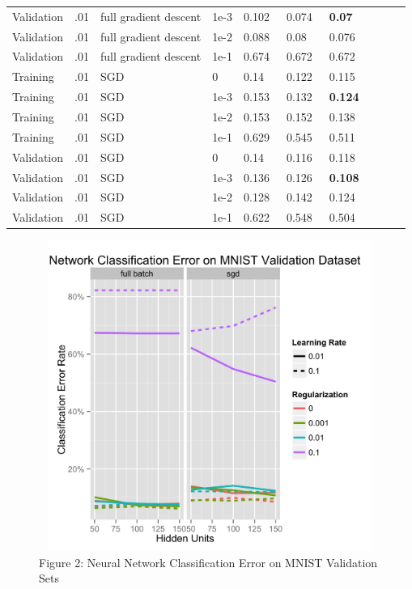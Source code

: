 \documentclass[10pt]{article}
\begin{document}
\begin{table}
\begin{tabular}{llllllllll}
Validation & .01 & full gradient descent & 1e-3 & 0.102 & 0.074 & \bf{0.07}  \\
Validation & .01 & full gradient descent & 1e-2 & 0.088 & 0.08  & 0.076 \\
Validation & .01 & full gradient descent & 1e-1 & 0.674 & 0.672 & 0.672 \\
\midrule
Training &.01 & SGD &  0 & 0.14  & 0.122 & 0.115 \\
Training &.01 & SGD & 1e-3 & 0.153 & 0.132 & \bf{0.124} \\
Training &.01 & SGD & 1e-2 & 0.153 & 0.152 & 0.138 \\
Training &.01 & SGD & 1e-1 & 0.629 & 0.545 & 0.511 \\
\midrule
Validation & .01 & SGD &  0 & 0.14  & 0.116 & 0.118 \\
Validation & .01 & SGD & 1e-3 & 0.136 & 0.126 & \bf{0.108} \\
Validation & .01 & SGD & 1e-2 & 0.128 & 0.142 & 0.124 \\
Validation & .01 & SGD & 1e-1 & 0.622 & 0.548 & 0.504 \\
\bottomrule
\end{tabular}
\end{table}

\begin{figure}
\center
\includegraphics[height=4in, width=5in]{nnperf.jpg}
\caption*{Figure 2: Neural Network Classification Error on MNIST Validation Sets}
\end{figure}
	
\end{document}
